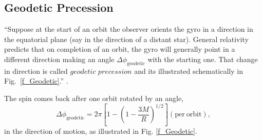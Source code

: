 \documentclass[%
 reprint,
 amsmath,amssymb,
 aps,
]{revtex4-1}
\numberwithin{equation}{section}%
\begin{document}
\subsection{Geodetic Precession}
\label{sec:GeodeticPrecession}

``Suppose at the start of an orbit the observer orients the gyro in a direction in the equatorial plane (say in the direction of a distant star). General relativity predicts that on completion of an orbit, the gyro will generally point in a different direction making an angle $\Delta \phi_{\mathrm{geodetic}}$ with the starting one. That change in direction is called $\textit{geodetic precession}$ and its illustrated schematically in Fig.~\ref{f_Geodetic}.'' \cite{Hartle}.


The spin comes back after one orbit rotated by an angle,
\begin{equation}
    \Delta \phi_{\mathrm{geodetic}} = 2 \pi \left[ 1 - \left( 1 - \frac{3M}{R} \right)^{1/2} \right] \mathrm{(per \ orbit)},
\end{equation}
in the direction of motion, as illustrated in Fig. \ref{f_Geodetic}.


\end{document}
